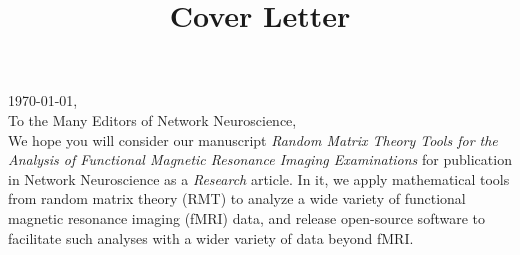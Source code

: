 \documentclass[10pt]{article}
\begin{document}
% 
\thispagestyle{nofooter}  %
\setlength{\headheight}{30.0pt}
\normalsize

\title{Cover Letter}





\noindent
\today, \\
To the Many Editors of Network Neuroscience, \\

We hope you will consider our manuscript \emph{Random Matrix Theory Tools for the Analysis of
Functional Magnetic Resonance Imaging Examinations} for publication in Network Neuroscience as a
\emph{Research} article. In it, we apply mathematical tools from random matrix theory (RMT) to
analyze a wide variety of functional magnetic resonance imaging (fMRI) data, and release
open-source software \citep{bergerStfxecutablesEmpyricalRMTPreliminary2020} to facilitate such analyses with a wider variety of data beyond fMRI.
\end{document}
